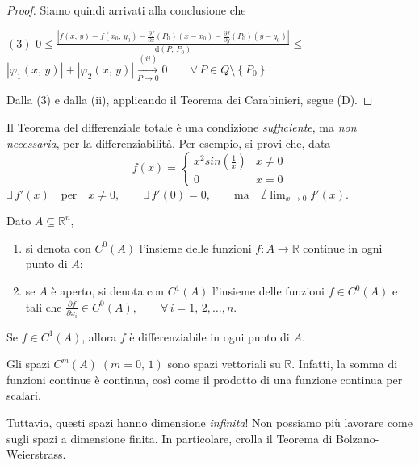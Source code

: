 \begin{proof}
Siamo quindi arrivati alla conclusione che
\begin{center}
$\mathrm{(3)}$
\hfill
$\displaystyle
0 \leq \frac{\displaystyle \left\lvert f(x,\,y)-f(x_0,\,y_0) - \frac{\partial f}{\partial x}(P_0)(x-x_0) - \frac{\partial f}{\partial y}(P_0)(y-y_0) \right\rvert }{\mathrm{d}(P,\,P_0)} \leq$
\hfill \null \\
\vskip 16pt
\hfill
$\displaystyle
\left\lvert \varphi_1(x,\,y) \right\rvert + \left\lvert \varphi_2(x,\,y) \right\rvert \overset{(ii)}{\underset{P \rightarrow 0}{\longrightarrow}} 0 \qquad \forall \, P \in Q \setminus \left\lbrace P_0 \right\rbrace
$
\hfill \null \\
\end{center}
Dalla (3) e dalla (ii), applicando il Teorema dei Carabinieri, segue (D).
\end{proof}


\begin{obs}
Il Teorema del differenziale totale è una condizione \emph{sufficiente}, ma \emph{non necessaria}, per la differenziabilità. Per esempio, si provi che, data
$$
f(x) =
\begin{cases}
\displaystyle x^2sin\left(\frac{1}{x}\right) & x \neq 0 \\
0 & x = 0
\end{cases}
$$
$\exists \, f'(x) \quad \text{per} \quad x \neq 0, \qquad \exists \, f'(0)=0, \qquad \text{ma} \quad \nexists \displaystyle \lim_{x \rightarrow 0} f'(x)$.
\end{obs}

\begin{definition}
Dato $A \subseteq \mathbb{R}^n$,
\begin{enumerate}[labelindent=\parindent,leftmargin=*,label=\textnormal{(\roman*)},start=1]
\item si denota con $C^0(A)$ l'insieme delle funzioni $f : A \longrightarrow \mathbb{R}$ continue in ogni punto di $A$;
\item se $A$ è aperto, si denota con $C^1(A)$ l'insieme delle funzioni $f \in C^0(A)$ e tali che $\displaystyle \frac{\partial f}{\partial x_i} \in C^0(A), \qquad \forall \, i=1,\,2,\ldots,n$.
\end{enumerate}
\end{definition}

\begin{cor}
Se $f \in C^1(A)$, allora $f$ è differenziabile in ogni punto di $A$.
\end{cor}

\begin{obs}
Gli spazi $C^m(A) \; (m=0,\,1)$ sono spazi vettoriali su $\mathbb{R}$. Infatti, la somma di funzioni continue è continua, così come il prodotto di una funzione continua per scalari.

Tuttavia, questi spazi hanno dimensione \emph{infinita}! Non possiamo più lavorare come sugli spazi a dimensione finita. In particolare, crolla il Teorema di Bolzano-Weierstrass.
\end{obs}

